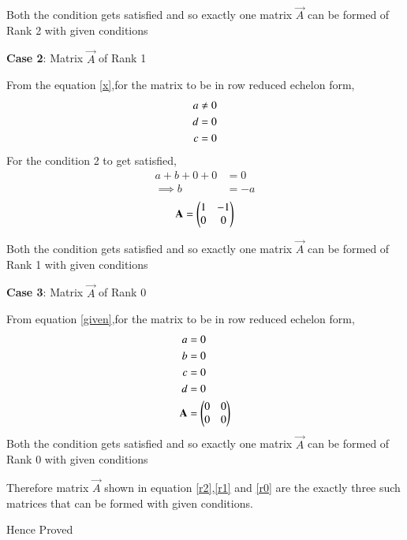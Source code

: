 \documentclass[journal,12pt,twocolumn]{IEEEtran}
\begin{document}
Both the condition gets satisfied and so exactly one matrix $\vec{A}$ can be formed of Rank 2 with given conditions 

\textbf{Case 2}: Matrix $\vec{A}$ of Rank 1

From the equation \eqref{x},for the matrix to be in row reduced echelon form,
\begin{align}
    a&\not=0\notag\\
    d&=0\notag\\
    c&=0\notag
\end{align}
For the condition 2 to get satisfied, 
\begin{align}
    a+b+0+0&=0\\
    \implies b&=-a
\end{align}
\begin{align}
    \mathbf{A}=\begin{pmatrix}1 & -1\\ 0 & 0\end{pmatrix}\label{r1}
\end{align}

Both the condition gets satisfied and so exactly one matrix $\vec{A}$ can be formed of Rank 1 with given conditions 

\textbf{Case 3}: Matrix $\vec{A}$ of Rank 0

From equation \eqref{given},for the matrix to be in row reduced echelon form,
\begin{align}
    a&=0\notag\\
    b&=0\notag\\
    c&=0\notag\\
    d&=0\notag\\
    \mathbf{A}&=\begin{pmatrix}0 & 0\\ 0 & 0\end{pmatrix}\label{r0}
\end{align}
Both the condition gets satisfied and so exactly one matrix $\vec{A}$ can be formed of Rank 0 with given conditions 

Therefore matrix $\vec{A}$ shown in equation \eqref{r2},\eqref{r1} and \eqref{r0} are the exactly three such matrices that can be formed with given conditions.
\begin{center}
    Hence Proved
\end{center}
\end{document}
